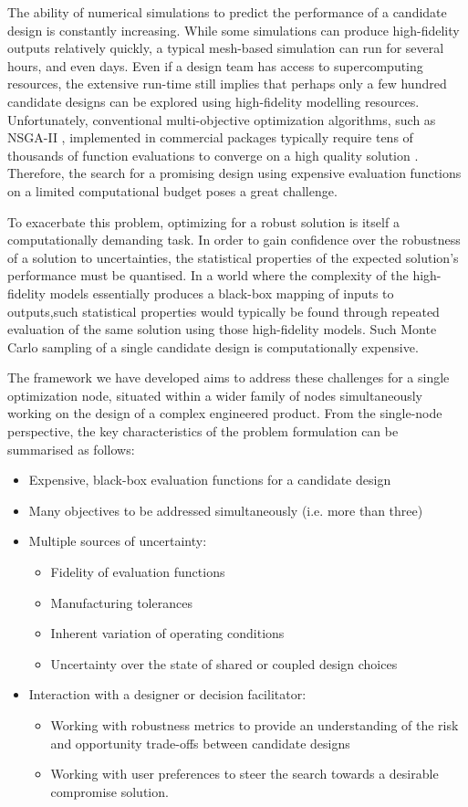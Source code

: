 \documentclass[10pt]{llncs}
\begin{document}
The ability of numerical simulations to predict the performance of a candidate
design is constantly increasing. While some simulations can produce high-fidelity outputs relatively quickly, a typical mesh-based simulation can run for several hours, and even days. Even if a design team has access to supercomputing resources, the extensive run-time still implies that perhaps only a few hundred candidate designs can be explored using high-fidelity modelling resources. Unfortunately, conventional multi-objective optimization algorithms,
such as NSGA-II \cite{deb2002fast}, implemented in commercial packages typically require tens
of thousands of function evaluations to converge on a high quality solution \cite{hansen2010comparing,zhou2011multiobjective}. Therefore, the search for a promising design using expensive evaluation functions on a limited computational budget poses a great challenge.

To exacerbate this problem, optimizing for a robust solution is itself a computationally
demanding task. In order to gain confidence over the robustness of a solution to uncertainties, the statistical properties of the expected solution's performance must be quantised. In a world where the complexity of the high-fidelity models essentially produces a black-box mapping of inputs to outputs,such statistical properties would typically be found through repeated evaluation of the same solution using those high-fidelity models. Such Monte Carlo
sampling of a single candidate design is computationally expensive.

The framework we have developed aims to address these challenges for a single optimization node, situated within a wider family of nodes simultaneously working on the design of a complex engineered product. From the single-node perspective, the key characteristics of the problem formulation can be summarised as follows: 
\begin{itemize}
	\item Expensive, black-box evaluation functions for a candidate design
	\item Many objectives to be addressed simultaneously (i.e. more than three)
	\item Multiple sources of uncertainty:
		\begin{itemize}
			\item Fidelity of evaluation functions
			\item Manufacturing tolerances
			\item Inherent variation of operating conditions
			\item Uncertainty over the state of shared or coupled design choices
		\end{itemize}
	\item Interaction with a designer or decision facilitator:
		\begin{itemize}
			\item Working with robustness metrics to provide an understanding of the risk and 						  opportunity trade-offs between candidate designs
			\item Working with user preferences to steer the search towards a desirable 				 	 		  compromise solution.
		\end{itemize}
\end{itemize}
\end{document}
